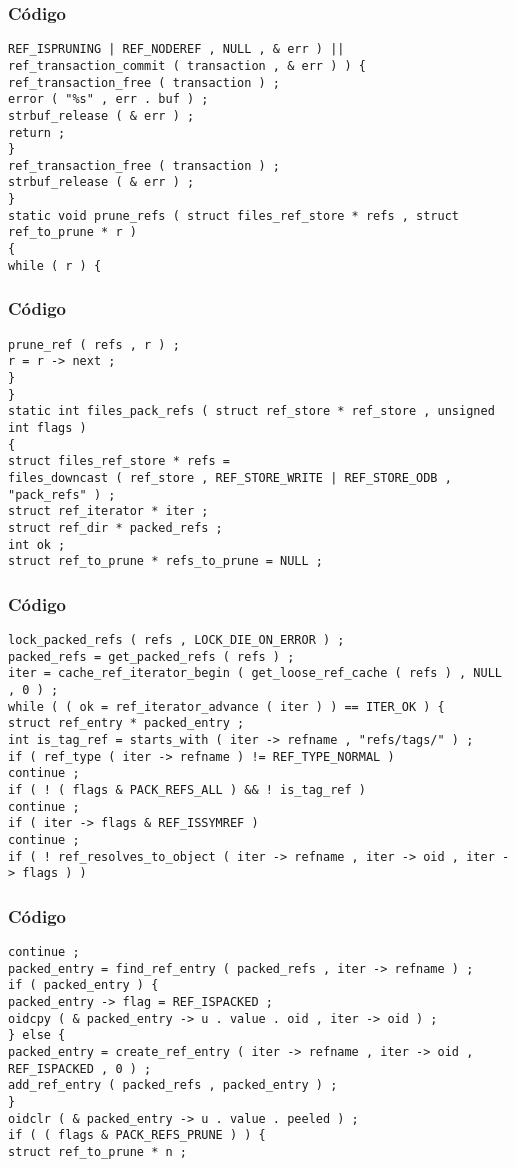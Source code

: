\documentclass{beamer}
\begin{document}
\begin{frame}[fragile]
\frametitle{C\'odigo}
\begin{verbatim}
REF_ISPRUNING | REF_NODEREF , NULL , & err ) || 
ref_transaction_commit ( transaction , & err ) ) { 
ref_transaction_free ( transaction ) ; 
error ( "%s" , err . buf ) ; 
strbuf_release ( & err ) ; 
return ; 
} 
ref_transaction_free ( transaction ) ; 
strbuf_release ( & err ) ; 
} 
static void prune_refs ( struct files_ref_store * refs , struct ref_to_prune * r ) 
{ 
while ( r ) { 
\end{verbatim}
\end{frame}
\begin{frame}[fragile]
\frametitle{C\'odigo}
\begin{verbatim}
prune_ref ( refs , r ) ; 
r = r -> next ; 
} 
} 
static int files_pack_refs ( struct ref_store * ref_store , unsigned int flags ) 
{ 
struct files_ref_store * refs = 
files_downcast ( ref_store , REF_STORE_WRITE | REF_STORE_ODB , 
"pack_refs" ) ; 
struct ref_iterator * iter ; 
struct ref_dir * packed_refs ; 
int ok ; 
struct ref_to_prune * refs_to_prune = NULL ; 
\end{verbatim}
\end{frame}
\begin{frame}[fragile]
\frametitle{C\'odigo}
\begin{verbatim}
lock_packed_refs ( refs , LOCK_DIE_ON_ERROR ) ; 
packed_refs = get_packed_refs ( refs ) ; 
iter = cache_ref_iterator_begin ( get_loose_ref_cache ( refs ) , NULL , 0 ) ; 
while ( ( ok = ref_iterator_advance ( iter ) ) == ITER_OK ) { 
struct ref_entry * packed_entry ; 
int is_tag_ref = starts_with ( iter -> refname , "refs/tags/" ) ; 
if ( ref_type ( iter -> refname ) != REF_TYPE_NORMAL ) 
continue ; 
if ( ! ( flags & PACK_REFS_ALL ) && ! is_tag_ref ) 
continue ; 
if ( iter -> flags & REF_ISSYMREF ) 
continue ; 
if ( ! ref_resolves_to_object ( iter -> refname , iter -> oid , iter -> flags ) ) 
\end{verbatim}
\end{frame}
\begin{frame}[fragile]
\frametitle{C\'odigo}
\begin{verbatim}
continue ; 
packed_entry = find_ref_entry ( packed_refs , iter -> refname ) ; 
if ( packed_entry ) { 
packed_entry -> flag = REF_ISPACKED ; 
oidcpy ( & packed_entry -> u . value . oid , iter -> oid ) ; 
} else { 
packed_entry = create_ref_entry ( iter -> refname , iter -> oid , 
REF_ISPACKED , 0 ) ; 
add_ref_entry ( packed_refs , packed_entry ) ; 
} 
oidclr ( & packed_entry -> u . value . peeled ) ; 
if ( ( flags & PACK_REFS_PRUNE ) ) { 
struct ref_to_prune * n ; 
\end{verbatim}
\end{frame}
\end{document}
